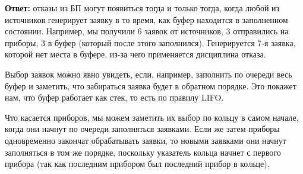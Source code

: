 \documentclass{article}
\begin{document}
\begin{enumerate}
	      \textbf{Ответ:} отказы из БП могут появиться тогда и только тогда, когда любой из источников генерирует заявку в то время, как буфер находится в заполненном состоянии. Например, мы получили 6 заявок от источников, 3 отправились на приборы, 3 в буфер (который после этого заполнился). Генерируется 7-я заявка, которой нет места в буфере, из-за чего применяется дисциплина отказа.

	      Выбор заявок можно явно увидеть, если, например, заполнить по очереди весь буфер и заметить, что забираться заявка будет в обратном порядке. Это покажет нам, что буфер работает как стек, то есть по правилу LIFO.

	      Что касается приборов, мы можем заметить их выбор по кольцу в самом начале, когда они начнут по очереди заполняться заявками. Если же затем приборы одновременно закончат обрабатывать заявки, то новыми заявками они начнут заполняться в том же порядке, поскольку указатель кольца начнет с первого прибора (так как последним прибором был последний прибор в кольце).
\end{enumerate}
\end{document}

